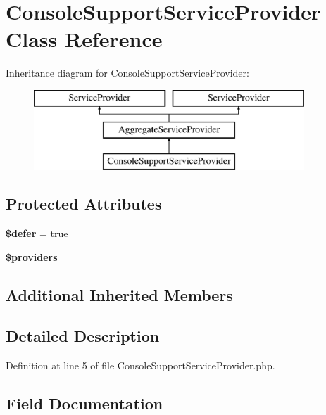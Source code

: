 \section{Console\+Support\+Service\+Provider Class Reference}
\label{class_illuminate_1_1_foundation_1_1_providers_1_1_console_support_service_provider}
Inheritance diagram for Console\+Support\+Service\+Provider\+:\begin{figure}[H]
\begin{center}
\leavevmode
\includegraphics[height=3.000000cm]{class_illuminate_1_1_foundation_1_1_providers_1_1_console_support_service_provider}
\end{center}
\end{figure}
\subsection*{Protected Attributes}
\begin{DoxyCompactItemize}
\item 
{\bf \$defer} = true
\item 
{\bf \$providers}
\end{DoxyCompactItemize}
\subsection*{Additional Inherited Members}


\subsection{Detailed Description}


Definition at line 5 of file Console\+Support\+Service\+Provider.\+php.



\subsection{Field Documentation}
